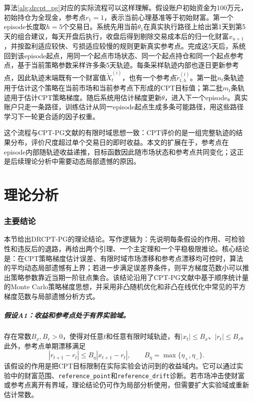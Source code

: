 \documentclass{sufethesismas}
\begin{document}
算法\ref{alg:drcpt_pg}对应的实际流程可以这样理解。假设账户初始资金为100万元，初始持仓为全现金，参考点$r_1=1$，表示当前心理基准等于初始财富。第一个episode长度取$h=5$个交易日。系统先用当前$\theta_1$在真实执行路径上给出第1天到第5天的组合建议，每天开盘后执行，收盘后得到剔除交易成本后的归一化财富$x_{u+1}$，并按盈利适应较快、亏损适应较慢的规则更新真实参考点。完成这5天后，系统回到该episode起点，用同一个起点市场状态、同一个起点持仓和同一个起点参考点，基于当前策略参数采样许多条5天轨迹。每条采样轨迹内部也逐日更新参考点，因此轨迹末端既有一个财富值$\widetilde X_t^{(i)}$，也有一个参考点$\widetilde r_{t,h}^{(i)}$。第一批$n_t$条轨迹用于估计这个策略在当前市场和当前参考点下形成的CPT目标值；第二批$m_t$条轨迹用于估计CPT策略梯度。随后系统用估计梯度更新$\theta$，进入下一个episode。真实账户只走一条路径，训练估计从同一episode起点生成多条可能路径，用这些路径学习下一轮更合适的因子权重。

这个流程与CPT-PG文献的有限时域思想一致：CPT评价的是一组完整轨迹的结果分布，评价尺度超过单个交易日的即时收益\citep{prashanth2016cumulative,lepel2026policygradients}。本文的扩展在于，参考点在episode内部随轨迹收益递推，目标函数因此随市场状态和参考点共同变化；这正是后续理论分析中需要动态局部遗憾的原因。
\chapter{理论分析}
\subsection{主要结论}
本节给出DRCPT-PG的理论结论。写作逻辑为：先说明每条假设的作用、可检验性和违反后的退路，再给出两个引理、一个主定理和一个平稳极限推论。核心结论是：在CPT策略梯度估计误差、有限时域市场漂移和参考点漂移均可控时，算法的平均动态局部遗憾有上界；若进一步满足误差界条件，则平方梯度范数小可以推出策略参数靠近当期一阶驻点集合。该结论沿用了CPT-PG文献中基于顺序统计量的Monte Carlo策略梯度思想\citep{lepel2026policygradients}，并采用非凸随机优化和非凸在线优化中常见的平方梯度范数与局部遗憾分析方式\citep{ghadimi2013stochastic,hazan2017efficient,aydore2019dynamic,hallak2021regret}。

\paragraph{假设A1：收益和参考点处于有界实验域。}
存在常数$B_x,B_r>0$，使得对任意$t$和任意有限时域轨迹，有$|x_t|\le B_x$、$|r_t|\le B_r$。此外，参考点单期漂移满足
\begin{equation}
\label{eq:a1_ref_drift}
|r_{t+1}-r_t|
\le
B_\eta |x_{t+1}-r_t|,
\qquad
B_\eta=\max\{\eta_+,\eta_-\}.
\end{equation}
该假设的作用是把CPT目标限制在实际实验会访问到的收益域内。它可以通过实验中的财富范围、\texttt{reference\_point}和\texttt{reference\_drift}诊断。若市场冲击使财富或参考点离开有界域，理论结论仍可作为局部分析使用，但需要扩大实验域或重新估计常数。
\end{document}
